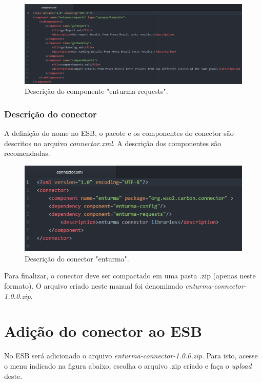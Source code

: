 \begin{figure}[htb]
\centering
\includegraphics[width=1.0\textwidth]{figuras/componente.PNG}
\caption{Descrição do componente "enturma-requests".}
\label{componente}
\end{figure}


\subsubsection{Descrição do conector}
A definição do nome no ESB, o pacote e os componentes do conector são descritos no arquivo \textit{connector.xml}. A descrição dos componentes são recomendadas.

\begin{figure}[htb]
\centering
\includegraphics[width=1.0\textwidth]{figuras/connectorxml.PNG}
\caption{Descrição do conector "enturma".}
\label{connectorxml}
\end{figure}


Para finalizar, o conector deve ser compactado em uma pasta .zip (apenas neste formato). O arquivo criado neste manual foi denominado \textit{enturma-connector-1.0.0.zip}.

\section{Adição do conector ao ESB}
No ESB será adicionado o arquivo \textit{enturma-connector-1.0.0.zip}. Para isto, acesse o menu indicado na figura abaixo, escolha o arquivo .zip criado e faça o \textit{upload} deste.

